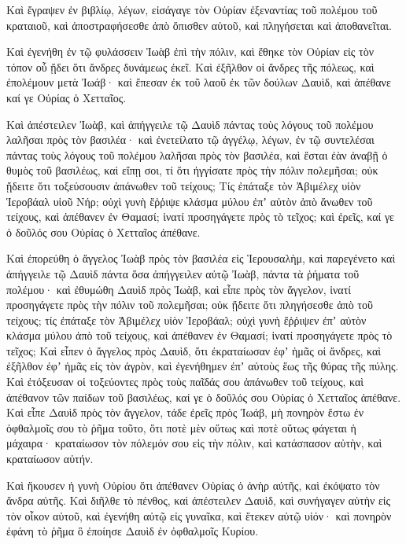 {Καὶ ἔγραψεν ἐν βιβλίῳ, λέγων, εἰσάγαγε τὸν Οὐρίαν ἐξεναντίας τοῦ πολέμου τοῦ κραταιοῦ, καὶ ἀποστραφήσεσθε ἀπὸ ὄπισθεν αὐτοῦ, καὶ πληγήσεται καὶ ἀποθανεῖται.
\par }{\PP {}Καὶ ἐγενήθη ἐν τῷ φυλάσσειν Ἰωὰβ ἐπὶ τὴν πόλιν, καὶ ἔθηκε τὸν Οὐρίαν εἰς τὸν τόπον οὗ ᾔδει ὅτι ἄνδρες δυνάμεως ἐκεῖ.
Καὶ ἐξῆλθον οἱ ἄνδρες τῆς πόλεως, καὶ ἐπολέμουν μετὰ Ἰωάβ· καὶ ἔπεσαν ἐκ τοῦ λαοῦ ἐκ τῶν δούλων Δαυὶδ, καὶ ἀπέθανε καί γε Οὐρίας ὁ Χετταῖος.
\par }{\PP {}Καὶ ἀπέστειλεν Ἰωὰβ, καὶ ἀπήγγειλε τῷ Δαυὶδ πάντας τοὺς λόγους τοῦ πολέμου λαλῆσαι πρὸς τὸν βασιλέα·
καὶ ἐνετείλατο τῷ ἀγγέλῳ, λέγων, ἐν τῷ συντελέσαι πάντας τοὺς λόγους τοῦ πολέμου λαλῆσαι πρὸς τὸν βασιλέα,
καὶ ἔσται ἐὰν ἀναβῇ ὁ θυμὸς τοῦ βασιλέως, καὶ εἴπῃ σοι, τί ὅτι ἠγγίσατε πρὸς τὴν πόλιν πολεμῆσαι; οὐκ ᾔδειτε ὅτι τοξεύσουσιν ἀπάνωθεν τοῦ τείχους;
Τίς ἐπάταξε τὸν Ἀβιμέλεχ υἱὸν Ἱεροβάαλ υἱοῦ Νήρ; οὐχὶ γυνὴ ἔῤῥιψε κλάσμα μύλου ἐπʼ αὐτὸν ἀπὸ ἄνωθεν τοῦ τείχους, καὶ ἀπέθανεν ἐν Θαμασί; ἱνατί προσηγάγετε πρὸς τὸ τεῖχος; καὶ ἐρεῖς, καί γε ὁ δοῦλός σου Οὐρίας ὁ Χετταῖος ἀπέθανε.
\par }{\PP {}Καὶ ἐπορεύθη ὁ ἄγγελος Ἰωὰβ πρὸς τὸν βασιλέα εἰς Ἱερουσαλὴμ, καὶ παρεγένετο καὶ ἀπήγγειλε τῷ Δαυὶδ πάντα ὅσα ἀπήγγειλεν αὐτῷ Ἰωὰβ, πάντα τὰ ῥήματα τοῦ πολέμου· καὶ ἐθυμώθη Δαυὶδ πρὸς Ἰωὰβ, καὶ εἶπε πρὸς τὸν ἄγγελον, ἱνατί προσηγάγετε πρὸς τὴν πόλιν τοῦ πολεμῆσαι; οὐκ ᾔδειτε ὅτι πληγήσεσθε ἀπὸ τοῦ τείχους; τίς ἐπάταξε τὸν Ἀβιμέλεχ υἱὸν Ἱεροβάαλ; οὐχὶ γυνὴ ἔῤῥιψεν ἐπʼ αὐτὸν κλάσμα μύλου ἀπὸ τοῦ τείχους, καὶ ἀπέθανεν ἐν Θαμασί; ἱνατί προσηγάγετε πρὸς τὸ τεῖχος;
Καὶ εἶπεν ὁ ἄγγελος πρὸς Δαυὶδ, ὅτι ἐκραταίωσαν ἐφʼ ἡμᾶς οἱ ἄνδρες, καὶ ἐξῆλθον ἐφʼ ἡμᾶς εἰς τὸν ἀγρὸν, καὶ ἐγενήθημεν ἐπʼ αὐτοὺς ἕως τῆς θύρας τῆς πύλης.
Καὶ ἐτόξευσαν οἱ τοξεύοντες πρὸς τοὺς παῖδάς σου ἀπάνωθεν τοῦ τείχους, καὶ ἀπέθανον τῶν παίδων τοῦ βασιλέως, καί γε ὁ δοῦλός σου Οὐρίας ὁ Χετταῖος ἀπέθανε.
Καὶ εἶπε Δαυὶδ πρὸς τὸν ἄγγελον, τάδε ἐρεῖς πρὸς Ἰωάβ, μὴ πονηρὸν ἔστω ἐν ὀφθαλμοῖς σου τὸ ῥῆμα τοῦτο, ὅτι ποτὲ μὲν οὕτως καὶ ποτὲ οὕτως φάγεται ἡ μάχαιρα· κραταίωσον τὸν πόλεμόν σου εἰς τὴν πόλιν, καὶ κατάσπασον αὐτὴν, καὶ κραταίωσον αὐτήν.
\par }{\PP {}Καὶ ἤκουσεν ἡ γυνὴ Οὐρίου ὅτι ἀπέθανεν Οὐρίας ὁ ἀνὴρ αὐτῆς, καὶ ἐκόψατο τὸν ἄνδρα αὐτῆς.
Καὶ διῆλθε τὸ πένθος, καὶ ἀπέστειλεν Δαυὶδ, καὶ συνήγαγεν αὐτὴν εἰς τὸν οἶκον αὐτοῦ, καὶ ἐγενήθη αὐτῷ εἰς γυναῖκα, καὶ ἔτεκεν αὐτῷ υἱόν· καὶ πονηρὸν ἐφάνη τὸ ῥῆμα ὃ ἐποίησε Δαυὶδ ἐν ὀφθαλμοῖς Κυρίου.

}
